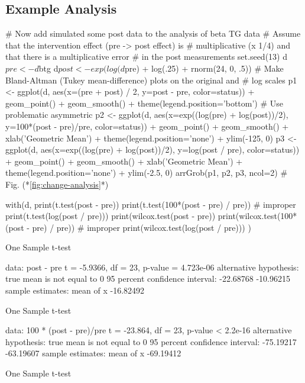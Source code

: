 \subsection{Example Analysis}
\begin{Schunk}
\begin{Sinput}
# Now add simulated some post data to the analysis of beta TG data
# Assume that the intervention effect (pre -> post effect) is
# multiplicative (x 1/4) and that there is a multiplicative error
# in the post measurements
set.seed(13)
d$pre  <- d$btg
d$post <- exp(log(d$pre) + log(.25) + rnorm(24, 0, .5))
# Make Bland-Altman (Tukey mean-difference) plots on the original and
# log scales
p1 <- ggplot(d, aes(x=(pre + post) / 2, y=post - pre, color=status)) +
  geom_point() + geom_smooth() + theme(legend.position='bottom')
# Use problematic asymmetric %
p2 <- ggplot(d, aes(x=exp((log(pre) + log(post))/2), y=100*(post - pre)/pre,
                    color=status)) + geom_point() + geom_smooth() +
      xlab('Geometric Mean') + theme(legend.position='none') +
      ylim(-125, 0)
p3 <- ggplot(d, aes(x=exp((log(pre) + log(post))/2), y=log(post / pre),
                    color=status)) + geom_point() + geom_smooth() +
      xlab('Geometric Mean') + theme(legend.position='none') + ylim(-2.5, 0)
arrGrob(p1, p2, p3, ncol=2)   # Fig. (*\ref{fig:change-analysis}*)
\end{Sinput}
\begin{Sinput}
with(d, {
     print(t.test(post - pre))
     print(t.test(100*(post - pre) / pre))       # improper
     print(t.test(log(post / pre)))
     print(wilcox.test(post - pre))
     print(wilcox.test(100*(post - pre) / pre))  # improper
     print(wilcox.test(log(post / pre)))
     } )
\end{Sinput}
\begin{Soutput}

	One Sample t-test

data:  post - pre
t = -5.9366, df = 23, p-value = 4.723e-06
alternative hypothesis: true mean is not equal to 0
95 percent confidence interval:
 -22.68768 -10.96215
sample estimates:
mean of x 
-16.82492 


	One Sample t-test

data:  100 * (post - pre)/pre
t = -23.864, df = 23, p-value < 2.2e-16
alternative hypothesis: true mean is not equal to 0
95 percent confidence interval:
 -75.19217 -63.19607
sample estimates:
mean of x 
-69.19412 


	One Sample t-test


\end{Soutput}
\end{Schunk}
